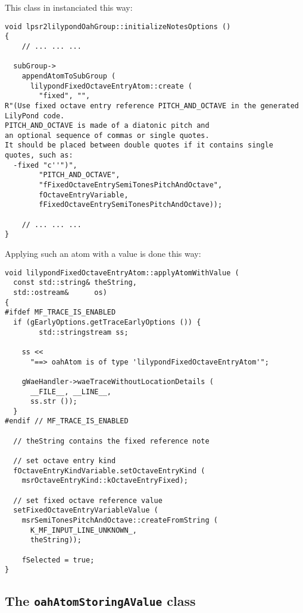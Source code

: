 This class in instanciated this way:
\begin{lstlisting}[language=CPlusPlus]
void lpsr2lilypondOahGroup::initializeNotesOptions ()
{
	// ... ... ...

  subGroup->
    appendAtomToSubGroup (
      lilypondFixedOctaveEntryAtom::create (
        "fixed", "",
R"(Use fixed octave entry reference PITCH_AND_OCTAVE in the generated LilyPond code.
PITCH_AND_OCTAVE is made of a diatonic pitch and
an optional sequence of commas or single quotes.
It should be placed between double quotes if it contains single quotes, such as:
  -fixed "c''")",
        "PITCH_AND_OCTAVE",
        "fFixedOctaveEntrySemiTonesPitchAndOctave",
        fOctaveEntryVariable,
        fFixedOctaveEntrySemiTonesPitchAndOctave));

	// ... ... ...
}
\end{lstlisting}

Applying such an atom with a value is done this way:
\begin{lstlisting}[language=CPlusPlus]
void lilypondFixedOctaveEntryAtom::applyAtomWithValue (
  const std::string& theString,
  std::ostream&      os)
{
#ifdef MF_TRACE_IS_ENABLED
  if (gEarlyOptions.getTraceEarlyOptions ()) {
		std::stringstream ss;

    ss <<
      "==> oahAtom is of type 'lilypondFixedOctaveEntryAtom'";

    gWaeHandler->waeTraceWithoutLocationDetails (
      __FILE__, __LINE__,
      ss.str ());
  }
#endif // MF_TRACE_IS_ENABLED

  // theString contains the fixed reference note

  // set octave entry kind
  fOctaveEntryKindVariable.setOctaveEntryKind (
    msrOctaveEntryKind::kOctaveEntryFixed);

  // set fixed octave reference value
  setFixedOctaveEntryVariableValue (
    msrSemiTonesPitchAndOctave::createFromString (
      K_MF_INPUT_LINE_UNKNOWN_,
      theString));

	fSelected = true;
}
\end{lstlisting}


\subsection{The {\tt oahAtomStoringAValue} class}

